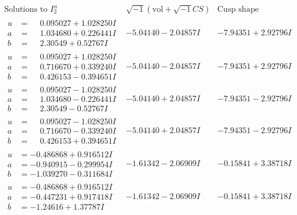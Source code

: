 \documentclass[1p]{elsarticle_modified}
\theoremstyle{definition}
\newcommand{\I}{\sqrt{-1}}
\begin{document}
$$\begin{array}{c|c|c}  
\text{Solutions to }I^u_{2}& \I (\text{vol} + \sqrt{-1}CS) & \text{Cusp shape}\\
 \hline 
\begin{aligned}
u &= \phantom{-}0.095027 + 1.028250 I \\
a &= \phantom{-}1.034680 + 0.226441 I \\
b &= \phantom{-}2.30549 + 0.52767 I\end{aligned}
 & -5.04140 - 2.04857 I & -7.94351 + 2.92796 I \\ \hline\begin{aligned}
u &= \phantom{-}0.095027 + 1.028250 I \\
a &= \phantom{-}0.716670 + 0.339240 I \\
b &= \phantom{-}0.426153 - 0.394651 I\end{aligned}
 & -5.04140 - 2.04857 I & -7.94351 + 2.92796 I \\ \hline\begin{aligned}
u &= \phantom{-}0.095027 - 1.028250 I \\
a &= \phantom{-}1.034680 - 0.226441 I \\
b &= \phantom{-}2.30549 - 0.52767 I\end{aligned}
 & -5.04140 + 2.04857 I & -7.94351 - 2.92796 I \\ \hline\begin{aligned}
u &= \phantom{-}0.095027 - 1.028250 I \\
a &= \phantom{-}0.716670 - 0.339240 I \\
b &= \phantom{-}0.426153 + 0.394651 I\end{aligned}
 & -5.04140 + 2.04857 I & -7.94351 - 2.92796 I \\ \hline\begin{aligned}
u &= -0.486868 + 0.916512 I \\
a &= -0.940915 - 0.299954 I \\
b &= -1.039270 - 0.311684 I\end{aligned}
 & -1.61342 - 2.06909 I & -0.15841 + 3.38718 I \\ \hline\begin{aligned}
u &= -0.486868 + 0.916512 I \\
a &= -0.447231 + 0.917418 I \\
b &= -1.24616 + 1.37787 I\end{aligned}
 & -1.61342 - 2.06909 I & -0.15841 + 3.38718 I \\ \hline\begin{aligned}

\end{aligned}
\end{array}$$
\end{document}
